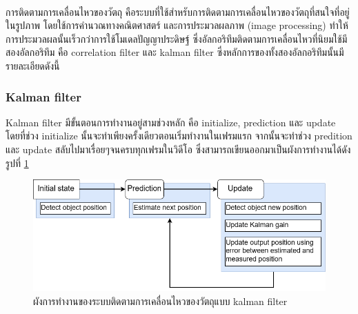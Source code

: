 การติดตามการเคลื่อนไหวของวัตถุ\textsuperscript{\cite{danelljan2014accurate}} คือระบบที่ใช้สำหรับการติดตามการเคลื่อนไหวของวัตถุที่สนใจที่อยู่ในรูปภาพ 
โดยใช้การคำนวณทางคณิตศาสตร์ และการประมวลผลภาพ (image processing) ทำให้การประมวลผลนั้นเร็วกว่าการใช้โมเดลปัญญาประดิษฐ์ ซึ่งอัลกอริทึมติดตามการเคลื่อนไหวที่นิยมใช้มีสองอัลกอริทึม
คือ correlation filter และ kalman filter ซึ่งหลักการของทั้งสองอัลกอริทึมนั้นมีรายละเอียดดังนี้
\subsubsection{Kalman filter}
Kalman filter มีขั้นตอนการทำงานอยู่สามช่วงหลัก คือ initialize, prediction และ update โดยที่ช่วง initialize นั้นจะทำเพียงครั้งเดียวตอนเริ่มทำงานในเฟรมแรก 
จากนั้นจะทำช่วง predition และ update สลับไปมาเรื่อยๆจนครบทุกเฟรมในวิดีโอ ซึ่งสามารถเขียนออกมาเป็นผังการทำงานได้ดังรูปที่ \ref{fig:kalman_concept}
\begin{figure}[!ht]
	\centering
	\includegraphics[width=1\textwidth]{chapter2/images/kalman_workflow.png}
		\caption{ผังการทำงานของระบบติดตามการเคลื่อนไหวของวัตถุแบบ kalman filter}
    	\label{fig:kalman_concept}
\end{figure}

